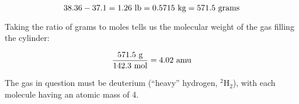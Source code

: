 $$38.36 - 37.1 = 1.26 \hbox{ lb} = 0.5715 \hbox{ kg} = 571.5 \hbox{ grams}$$

Taking the ratio of grams to moles tells us the molecular weight of the gas filling the cylinder:

$${571.5 \hbox{ g} \over 142.3 \hbox{ mol}} = 4.02 \hbox{ amu}$$

The gas in question must be deuterium (``heavy'' hydrogen, $^{2}$H$_{2}$), with each molecule having an atomic mass of 4.











